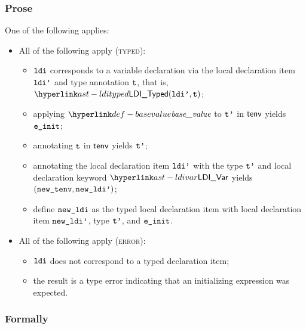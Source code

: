 \subsubsection{Prose}
One of the following applies:
\begin{itemize}
  \item All of the following apply (\textsc{typed}):
  \begin{itemize}
    \item $\ldi$ corresponds to a variable declaration via the local declaration item $\ldip$ and type annotation $\vt$,
          that is, $\LDITyped(\ldip, \vt)$;
    \item applying $\basevalue$ to $\vtp$ in $\tenv$ yields $\veinit$\ProseOrTypeError;
    \item annotating $\vt$ in $\tenv$ yields $\vtp$\ProseOrTypeError;
    \item annotating the local declaration item $\ldip$ with the type $\vtp$ and local declaration keyword $\LDIVar$
          yields $(\newtenv, \newldip)$\ProseOrTypeError;
    \item define $\newldi$ as the typed local declaration item with local declaration item $\newldip$, type $\vtp$, and
          $\veinit$.
  \end{itemize}

  \item All of the following apply (\textsc{error}):
  \begin{itemize}
    \item $\ldi$ does not correspond to a typed declaration item;
    \item the result is a type error indicating that an initializing expression was expected.
  \end{itemize}
\end{itemize}

\subsubsection{Formally}
\begin{mathpar}
\end{mathpar}

